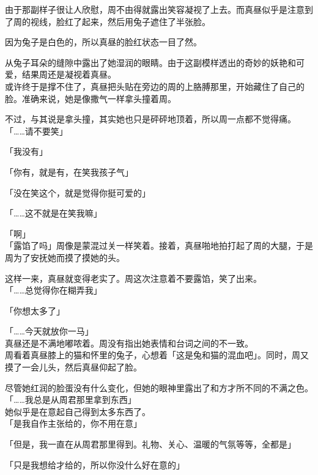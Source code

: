 由于那副样子很让人欣慰，周不由得就露出笑容凝视了上去。而真昼似乎是注意到了周的视线，脸红了起来，然后用兔子遮住了半张脸。

因为兔子是白色的，所以真昼的脸红状态一目了然。

从兔子耳朵的缝隙中露出了她湿润的眼睛。由于这副模样透出的奇妙的妖艳和可爱，结果周还是凝视着真昼。\\

或许终于是撑不住了，真昼把头贴在旁边的周的上胳膊那里，开始藏住了自己的脸。准确来说，她是像撒气一样拿头撞着周。

不过，与其说是拿头撞，其实她也只是砰砰地顶着，所以周一点都不觉得痛。\\

「……请不要笑」

「我没有」

「你有，就是有，在笑我孩子气」

「没在笑这个，就是觉得你挺可爱的」

「……这不就是在笑我嘛」

「啊」\\

「露馅了吗」周像是蒙混过关一样笑着。接着，真昼啪地拍打起了周的大腿，于是周为了安抚她而摸了摸她的头。

这样一来，真昼就变得老实了。周这次注意着不要露馅，笑了出来。\\

「……总觉得你在糊弄我」

「你想太多了」

「……今天就放你一马」\\

真昼还是不满地嘟哝着。周没有指出她表情和台词之间的不一致。\\

周看着真昼膝上的猫和怀里的兔子，心想着「这是兔和猫的混血吧」。同时，周又摸了一会儿头，然后真昼仰起了脸。

尽管她红润的脸蛋没有什么变化，但她的眼神里露出了和方才所不同的不满之色。\\

「……我总是从周君那里拿到东西」\\

她似乎是在意起自己得到太多东西了。\\

「是我自作主张给的，你不用在意」

「但是，我一直在从周君那里得到。礼物、关心、温暖的气氛等等，全都是」

「只是我想给才给的，所以你没什么好在意的」\\

